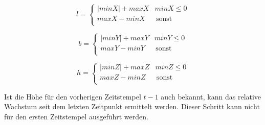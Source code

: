 \documentclass[12pt,titlepage, twoside]{article}
\begin{document}
\begin{equation}
    \label{eq:length}
    l = \left\{
    \begin{array}{ll}
    |minX| + maxX & minX \leq 0 \\
    maxX - minX & \, \textrm{sonst} \\
    \end{array}
    \right. 
\end{equation}

\begin{equation}
    \label{eq:width}
    b = \left\{
    \begin{array}{ll}
    |minY| + maxY & minY \leq 0 \\
    maxY - minY & \, \textrm{sonst} \\
    \end{array}
    \right. 
\end{equation}

\begin{equation}
    \label{eq:height}
    h = \left\{
    \begin{array}{ll}
    |minZ| + maxZ & minZ \leq 0 \\
    maxZ - minZ & \, \textrm{sonst} \\
    \end{array}
    \right. 
\end{equation}

Ist die Höhe für den vorherigen Zeitstempel $t-1$ auch bekannt, kann das relative Wachstum seit dem letzten Zeitpunkt ermittelt werden. Dieser Schritt kann nicht für den ersten Zeitstempel ausgeführt werden.
\end{document}
